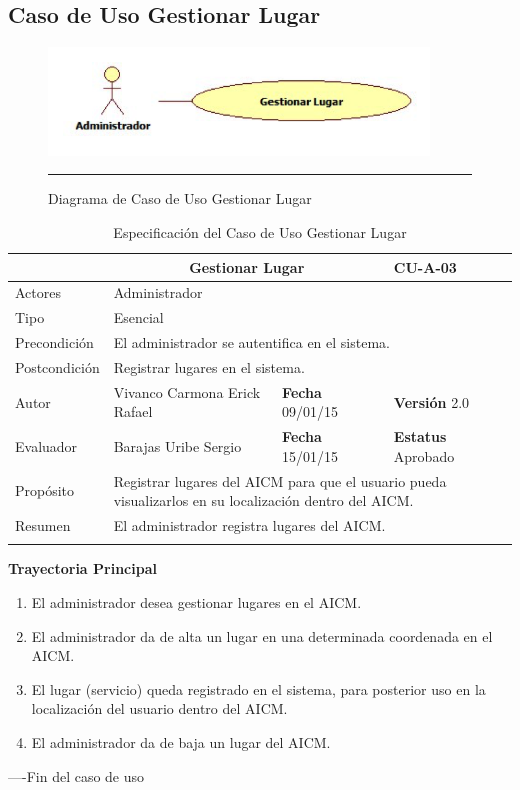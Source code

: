 \subsection{Caso de Uso Gestionar Lugar}

\begin{figure}[htbp]
	\centering
		\includegraphics[width=0.9\textwidth]{Figuras/cuGestionarLugar.png}
		\rule{30em}{0.5pt}
	\caption[Diagrama de Caso de Uso Gestionar Lugar]{Diagrama de Caso de Uso Gestionar Lugar}
	\label{fig:cuGestionarLugar}
\end{figure}

\begin{longtable}{|p{2.5cm}|p{6.4cm}|p{2cm}|p{2cm}|}
	\hline
		\rowcolor[RGB]{51,153,255}{Caso de Uso}&\multicolumn{2}{c}{Gestionar Lugar}&{\textbf{CU-A-03}}\\
	\hline
		{Actores}&\multicolumn{3}{p{11.2cm}|}{Administrador}\\
	\hline
		{Tipo}&\multicolumn{3}{p{11.2cm}|}{Esencial}\\
	\hline
		{Precondición}&\multicolumn{3}{p{11.2cm}|}{El administrador se autentifica en el sistema.}\\
	\hline
		{Postcondición}&\multicolumn{3}{p{11.2cm}|}{Registrar lugares en el sistema.}\\
	\hline
		{Autor}&{Vivanco Carmona Erick Rafael}&{\textbf{Fecha} 09/01/15}&{\textbf{Versión} 2.0}\\
			\hline
		{Evaluador}&{Barajas Uribe Sergio}&{\textbf{Fecha} 15/01/15}&{\textbf{Estatus} Aprobado}\\
	\hline
		{Propósito}&\multicolumn{3}{p{11.2cm}|}{Registrar lugares del AICM para que el usuario pueda visualizarlos en su localización dentro del AICM.}\\
	\hline
		{Resumen}&\multicolumn{3}{p{11.2cm}|}{El administrador registra lugares del AICM.}\\	
	\hline
	\caption[Especificación del Caso de Uso Gestionar Lugar]{Especificación del Caso de Uso Gestionar Lugar}
    	\label{tab:cuGestionarLugar}
\end{longtable}
\newpage
\begin{flushleft}
	\textbf{Trayectoria Principal}\\
	\begin{enumerate}
		\item El administrador desea gestionar lugares en el AICM.
		\item El administrador da de alta un lugar en una determinada coordenada en el AICM.
		\item El lugar (servicio) queda registrado en el sistema, para posterior uso en la localización del usuario dentro del AICM.
		\item El administrador da de baja un lugar del AICM.
	\end{enumerate}
\end{flushleft}
----Fin del caso de uso